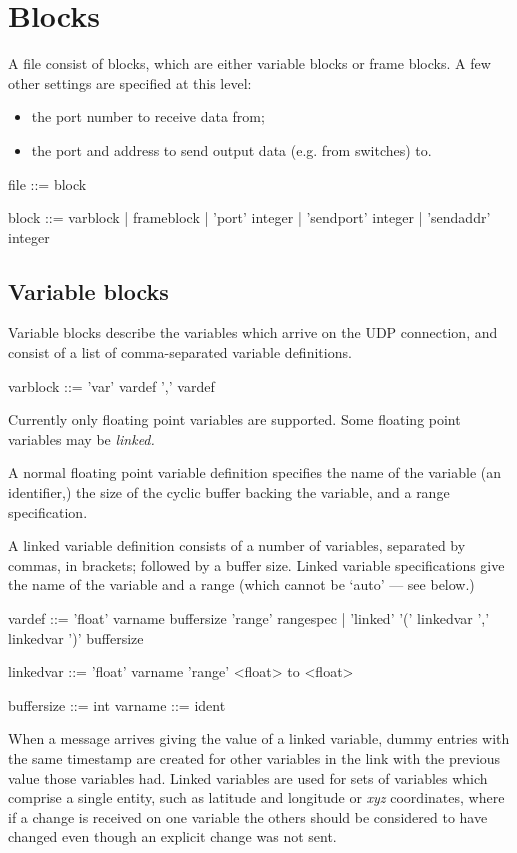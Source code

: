 \section{Blocks}
A file consist of blocks, which are either variable blocks
or frame blocks. A few other settings are specified at this level:
\begin{itemize}
\item the port number to receive data from;
\item the port and address to send output data (e.g. from switches)
to.
\end{itemize}


\begin{v}
file        ::= { block }

block       ::= varblock
            |   frameblock
            |   'port' integer
            |   'sendport' integer
            |   'sendaddr' integer
            
\end{v}



\subsection{Variable blocks}
Variable blocks describe the variables which arrive on the UDP
connection, and consist of a list of comma-separated variable definitions.
\begin{v}
varblock    ::= 'var' {vardef ','} vardef
\end{v}
Currently only floating point variables are supported.
Some floating point variables may be \emph{linked.}

A normal floating point variable definition specifies the name of the variable
(an identifier,) the size of the cyclic buffer backing the variable,
and a range specification.

A linked variable definition consists of a number of variables,
separated by commas, in brackets; followed by a buffer size.
Linked variable specifications give the name of the variable and
a range (which cannot be `auto' --- see below.)
\begin{v}
vardef      ::= 'float' varname buffersize 'range' rangespec
            |   'linked' '(' { linkedvar ',' } linkedvar ')' buffersize

linkedvar   ::= 'float' varname 'range' <float> to <float>

buffersize  ::= int
varname     ::= ident
            
\end{v}
When a message arrives giving the value of a linked variable, dummy
entries with the same timestamp are created for other variables
in the link with the previous value those variables had. Linked
variables are used for sets of variables which comprise a single
entity, such as latitude and longitude or \emph{xyz} coordinates,
where if a change is received on one variable the others should be
considered to have changed even though an explicit change was not
sent.

